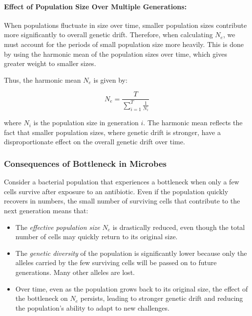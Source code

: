 \documentclass[10pt,a4paper]{scrbook}
\begin{document}
\paragraph{Effect of Population Size Over Multiple Generations:}
When populations fluctuate in size over time, smaller population sizes contribute more significantly to overall genetic drift. Therefore, when calculating \(N_e\), we must account for the periods of small population size more heavily. This is done by using the harmonic mean of the population sizes over time, which gives greater weight to smaller sizes.

Thus, the harmonic mean \(N_e\) is given by:

\begin{equation}
N_e = \frac{T}{\sum_{i=1}^{T} \frac{1}{N_i}}
\end{equation}

where \(N_i\) is the population size in generation \(i\). The harmonic mean reflects the fact that smaller population sizes, where genetic drift is stronger, have a disproportionate effect on the overall genetic drift over time.

\subsubsection{Consequences of Bottleneck in Microbes}

Consider a bacterial population that experiences a bottleneck when only a few cells survive after exposure to an antibiotic. Even if the population quickly recovers in numbers, the small number of surviving cells that contribute to the next generation means that:

\begin{itemize}
    \item The \textit{effective population size} \(N_e\) is drastically reduced, even though the total number of cells may quickly return to its original size.
    \item The \textit{genetic diversity} of the population is significantly lower because only the alleles carried by the few surviving cells will be passed on to future generations. Many other alleles are lost.
    \item Over time, even as the population grows back to its original size, the effect of the bottleneck on \(N_e\) persists, leading to stronger genetic drift and reducing the population's ability to adapt to new challenges.
\end{itemize}
\end{document}
